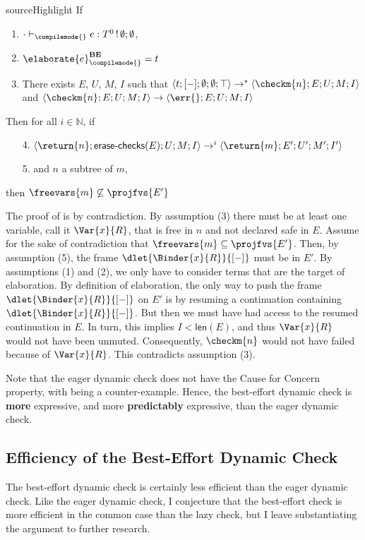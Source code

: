 \begin{theorem}{sourceHighlight}\label{thm:best-effort-cause-for-concern} If 
  \begin{enumerate}
    \item $\cdot \vdash_{\compilemode{}} e: T^0 \, ! \, \emptyset;\emptyset$, 
    \item $\elaborate{e}_{\compilemode{}}^{\textbf{BE}} = t$
    \item There exists $E$, $U$, $M$, $I$ such that $\langle t; [-];\emptyset; \emptyset; \top \rangle \to^{*}\langle \checkm{n}; E; U; M; I \rangle$
    and $\langle \checkm{n}; E; U; M; I \rangle \to \langle \err{}; E; U; M; I \rangle$
  \end{enumerate}
Then for all $i \in \mathbb{N}$, if 
\begin{enumerate}
  \item[4.] $\langle \return{n}; \textsf{erase-checks}(E); U; M; I \rangle \to^{i} \langle \return{m}; E'; U'; M'; I' \rangle$
  \item[5.] and $n$ a subtree of $m$,  
\end{enumerate}
then $\freevars{m} \not\subseteq \projfvs{E'}$  
\end{theorem}

The proof of  is by contradiction. By assumption (3) there must be at least one variable, call it $\Var{x}{R}$, that is free in $n$ and not declared safe in $E$. Assume for the sake of contradiction that $\freevars{m} \subseteq \projfvs{E'}$. Then, by assumption (5), the frame $\dlet{\Binder{x}{R}}{[-]}$ must be in $E'$. By assumptions (1) and (2), we only have to consider terms that are the target of elaboration. By definition of elaboration, the only way to push the frame $\dlet{\Binder{x}{R}}{[-]}$ on $E'$ is by resuming a continuation containing $\dlet{\Binder{x}{R}}{[-]}$. But then we must have had access to the resumed continuation in $E$. In turn, this implies $I < \textsf{len}(E)$, and thus $\Var{x}{R}$ would not have been unmuted. Consequently, $\checkm{n}$ would not have failed because of $\Var{x}{R}$. This contradicts assumption (3). 

Note that the eager dynamic check does not have the Cause for Concern property, with  being a counter-example. Hence, the best-effort dynamic check is \textbf{more} expressive, and more \textbf{predictably} expressive, than the eager dynamic check. 

\subsection{Efficiency of the Best-Effort Dynamic Check}\label{subsection:best-effort-efficient}
The best-effort dynamic check is certainly less efficient than the eager dynamic check. Like the eager dynamic check, I conjecture that the best-effort check is more efficient in the common case than the lazy check, but I leave substantiating the argument to further research.

